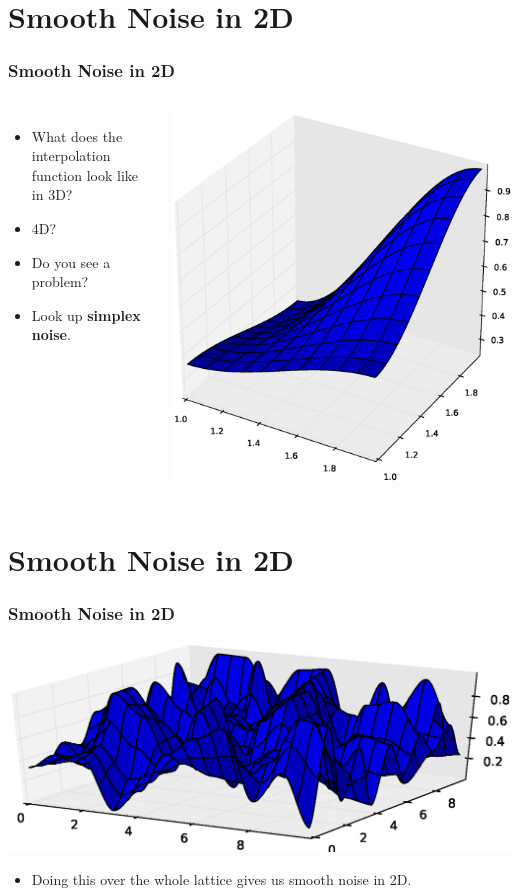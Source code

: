 \documentclass[slidestop,xcolor=pst]{beamer}
\newcommand{\sect}[1]{
\section{#1}
\begin{frame}[fragile]\frametitle{#1}
}
\begin{document}
\sect{Smooth Noise in 2D}
\begin{columns}[T]
\begin{itemize}
\item What does the interpolation function look like in 3D?
\item  4D?
\item Do you see a problem?
\item Look up {\bf simplex noise}.
\end{itemize}
\includegraphics[width=\textwidth]{onesquaresurface.eps}
\end{columns}
\end{frame}




\sect{Smooth Noise in 2D}
\includegraphics[width=\textwidth]{smoothnoisesurface.eps}
\begin{itemize}
\item Doing this over the whole lattice gives us smooth noise in 2D.
\end{itemize}
\end{frame}
\end{document}
